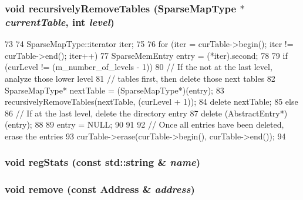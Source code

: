 \hypertarget{classSparseMemory_a9a883632739ed6248cebecc6e3fedc00}{
\subsubsection[{recursivelyRemoveTables}]{\setlength{\rightskip}{0pt plus 5cm}void recursivelyRemoveTables ({\bf SparseMapType} $\ast$ {\em currentTable}, \/  int {\em level})}}
\label{classSparseMemory_a9a883632739ed6248cebecc6e3fedc00}



\begin{DoxyCode}
73 {
74     SparseMapType::iterator iter;
75 
76     for (iter = curTable->begin(); iter != curTable->end(); iter++) {
77         SparseMemEntry entry = (*iter).second;
78 
79         if (curLevel != (m_number_of_levels - 1)) {
80             // If the not at the last level, analyze those lower level
81             // tables first, then delete those next tables
82             SparseMapType* nextTable = (SparseMapType*)(entry);
83             recursivelyRemoveTables(nextTable, (curLevel + 1));
84             delete nextTable;
85         } else {
86             // If at the last level, delete the directory entry
87             delete (AbstractEntry*)(entry);
88         }
89         entry = NULL;
90     }
91 
92     // Once all entries have been deleted, erase the entries
93     curTable->erase(curTable->begin(), curTable->end());
94 }
\end{DoxyCode}
\hypertarget{classSparseMemory_a3dd3443357312bcb75580eaa508c48a4}{
\subsubsection[{regStats}]{\setlength{\rightskip}{0pt plus 5cm}void regStats (const std::string \& {\em name})}}
\label{classSparseMemory_a3dd3443357312bcb75580eaa508c48a4}
\hypertarget{classSparseMemory_a8cae1419257c78d90715dd87697f9f74}{
\subsubsection[{remove}]{\setlength{\rightskip}{0pt plus 5cm}void remove (const {\bf Address} \& {\em address})}}
\label{classSparseMemory_a8cae1419257c78d90715dd87697f9f74}



